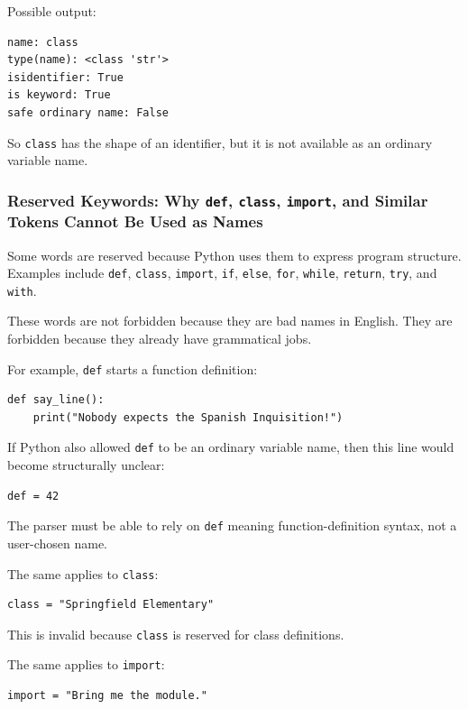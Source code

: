 Possible output:

\begin{verbatim}
name: class
type(name): <class 'str'>
isidentifier: True
is keyword: True
safe ordinary name: False
\end{verbatim}

So \texttt{class} has the shape of an identifier, but it is not available as an ordinary variable name.

\subsubsection{Reserved Keywords: Why \texttt{def}, \texttt{class}, \texttt{import}, and Similar Tokens Cannot Be Used as Names}

Some words are reserved because Python uses them to express program structure. Examples include \texttt{def}, \texttt{class}, \texttt{import}, \texttt{if}, \texttt{else}, \texttt{for}, \texttt{while}, \texttt{return}, \texttt{try}, and \texttt{with}.

These words are not forbidden because they are bad names in English. They are forbidden because they already have grammatical jobs.

For example, \texttt{def} starts a function definition:

\begin{verbatim}
def say_line():
    print("Nobody expects the Spanish Inquisition!")
\end{verbatim}

If Python also allowed \texttt{def} to be an ordinary variable name, then this line would become structurally unclear:

\begin{verbatim}
def = 42
\end{verbatim}

The parser must be able to rely on \texttt{def} meaning function-definition syntax, not a user-chosen name.

The same applies to \texttt{class}:

\begin{verbatim}
class = "Springfield Elementary"
\end{verbatim}

This is invalid because \texttt{class} is reserved for class definitions.

The same applies to \texttt{import}:

\begin{verbatim}
import = "Bring me the module."
\end{verbatim}

